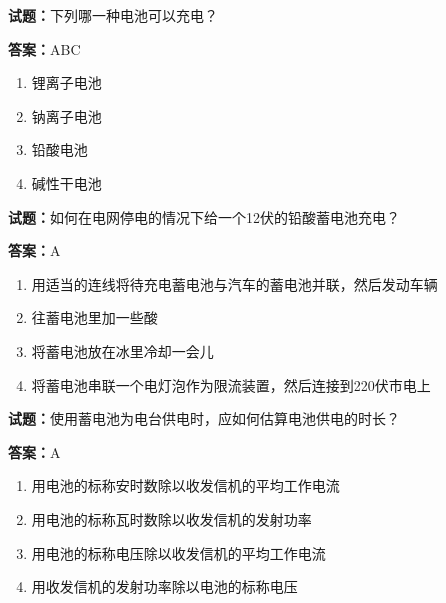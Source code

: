 \documentclass{ctexbook}
\begin{document}




\vspace{1em}

\textbf{试题：}下列哪一种电池可以充电？ 

\textbf{答案：}ABC 

\begin{enumerate}[leftmargin=3em]
  \item 锂离子电池 

  \item 钠离子电池 

  \item 铅酸电池 

  \item 碱性干电池 

\end{enumerate}





\vspace{1em}

\textbf{试题：}如何在电网停电的情况下给一个12伏的铅酸蓄电池充电？ 

\textbf{答案：}A 

\begin{enumerate}[leftmargin=3em]
  \item 用适当的连线将待充电蓄电池与汽车的蓄电池并联，然后发动车辆 

  \item 往蓄电池里加一些酸 

  \item 将蓄电池放在冰里冷却一会儿 

  \item 将蓄电池串联一个电灯泡作为限流装置，然后连接到220伏市电上 

\end{enumerate}





\vspace{1em}

\textbf{试题：}使用蓄电池为电台供电时，应如何估算电池供电的时长？ 

\textbf{答案：}A 

\begin{enumerate}[leftmargin=3em]
  \item 用电池的标称安时数除以收发信机的平均工作电流 

  \item 用电池的标称瓦时数除以收发信机的发射功率 

  \item 用电池的标称电压除以收发信机的平均工作电流 

  \item 用收发信机的发射功率除以电池的标称电压 


\end{enumerate}
\end{document}

